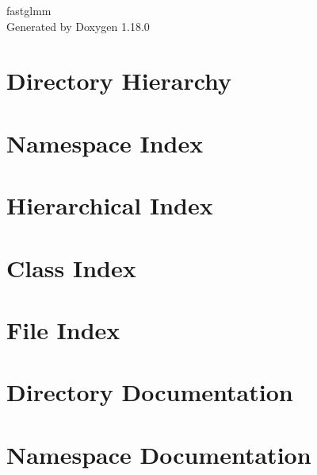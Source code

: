 \documentclass[twoside]{book}
\newcommand{\+}{\discretionary{\mbox{\scriptsize$\hookleftarrow$}}{}{}}
\newcommand{\clearemptydoublepage}{%
    \newpage{\pagestyle{empty}\cleardoublepage}%
  }
\begin{document}
  \raggedbottom
    \hypersetup{pageanchor=false,
                bookmarksnumbered=true,
                pdfencoding=unicode
               }
  \begin{titlepage}
  \vspace*{7cm}
  \begin{center}%
  {\Large fastglmm}\\
  \vspace*{1cm}
  {\large Generated by Doxygen 1.18.0}\\
  \end{center}
  \end{titlepage}
  \clearemptydoublepage
  \tableofcontents
  \clearemptydoublepage
  \hypersetup{pageanchor=true}
\chapter{Directory Hierarchy}

\chapter{Namespace Index}

\chapter{Hierarchical Index}

\chapter{Class Index}

\chapter{File Index}

\chapter{Directory Documentation}



\chapter{Namespace Documentation}

\end{document}

